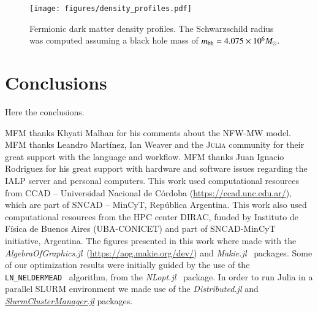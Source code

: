\documentclass[twocolumn]{aa}
\begin{document}
\begin{figure*}
   \centering
   \texttt{[image: figures/density\_profiles.pdf]}
   \caption{Fermionic dark matter density profiles. The Schwarzschild radius was computed assuming a black hole mass of $m_{\rm{bh}}=4.075\times10^6 M_\odot$.}

   \label{fig:going_compact}
\end{figure*}


\section{Conclusions}
\label{sec:conclusions}
Here the conclusions.


\begin{acknowledgements}
    MFM thanks Khyati Malhan for his comments about the NFW-MW model.
    MFM thanks Leandro Martínez, Ian Weaver and the \textsc{Julia} community for their
    great support with the language and workflow.
    MFM thanks Juan Ignacio Rodriguez for his great support with hardware and
    software issues regarding the IALP server and personal computers.
    This work used computational resources from CCAD – Universidad
    Nacional de Córdoba (\href{https://ccad.unc.edu.ar/}{https://ccad.unc.edu.ar/}),
    which are part of SNCAD – MinCyT, República Argentina.
    This work also used computational resources from the HPC center DIRAC,
    funded by Instituto de Física de Buenos Aires (UBA-CONICET) and part of SNCAD-MinCyT initiative, Argentina.
    The figures presented in this work where made with the
    {\it AlgebraOfGraphics.jl}~(\href{https://aog.makie.org/dev/}{https://aog.makie.org/dev/}) and
    {\it Makie.jl}~\citep{DanischKrumbiegel2021}
    packages. Some of our optimization results were initially guided by the use of the \texttt{LN\_NELDERMEAD}~\citep{NELDERMEAD,10.1093/comjnl/8.1.42,shere} algorithm, from the {\it NLopt.jl}~\citep{NLopt} package.
    In order to run {\sc Julia} in a parallel SLURM environment we made use of the {\it Distributed.jl} and \href{https://github.com/kleinhenz/SlurmClusterManager.jl}{\it SlurmClusterManager.jl} packages.
\end{acknowledgements}

%
%
%
\end{document}
